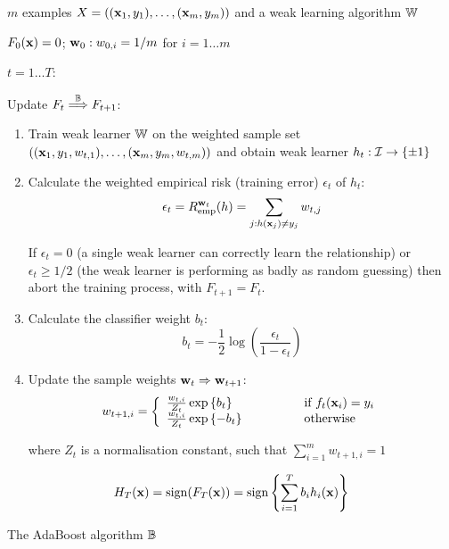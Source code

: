 \begin{linefigure}
\label{fig:boosting algorithm}
 $m$ examples $X = ((\mathbf{x}_1, y_1), \ldots, (\mathbf{x}_m,
y_m))$ and a weak learning algorithm $\mathbb{W}$
\par
{} $F_0(\mathbf{x}) = 0$; $\mathbf{w}_0 : w_{0,i} = 1/m$ for
$i=1 \ldots m$ 
\par
{} $t=1 \ldots T$:
\par
\noindent Update $F_t \stackrel{\mathbb{B}}{\Longrightarrow} F_{t+1}$: 
\par
\begin{enumerate}

\item	Train weak learner $\mathbb{W}$ on the weighted sample set 
	$((\mathbf{x}_1, y_1, w_{t,1}), \ldots, (\mathbf{x}_m, y_m, w_{t,m}))$
	and obtain weak learner $h_t : \mathcal{I} \rightarrow \{\pm 1\}$

\item	Calculate the weighted empirical risk (training error)
	$\epsilon_t$ of $h_t$: 
	\begin{equation}
	\epsilon_t = R_{\mathrm{emp}}^{\mathbf{w}_t}(h) = \sum_{j : h(\mathbf{x}_j) \neq
	y_j} w_{t,j}
	\end{equation}

	If $\epsilon_t = 0$ (a single weak learner can correctly learn
	the relationship) or $\epsilon_t \geq 1/2$ (the weak
	learner is performing as badly as random guessing) then abort
	the training process, with $F_{t+1} = F_{t}$.

\item	Calculate the classifier weight $b_t$:
	\begin{equation}
	b_t = - \frac{1}{2} \log \left( \frac{\epsilon_t}{1 -
	\epsilon_t} \right)
	\end{equation}

\item	Update the sample weights $\mathbf{w}_t \Rightarrow \mathbf{w}_{t+1}$:
	\begin{equation}
	w_{t+1, i} = \left\{
	\begin{array}{ll}
		\frac{w_{t, i}}{Z_t} \exp \left\{ b_t \right\}&	\qquad
		\qquad \mbox{if  $f_t(\mathbf{x}_i) = y_i$} \\
		\frac{w_{t, i}}{Z_t} \exp \left\{ -b_t \right\} & \qquad \qquad
		\mbox{otherwise} \\
	\end{array} \right.
	\label{eqn:sample weight update}
	\end{equation}

	where $Z_t$ is a normalisation constant, such that
	$\sum_{i=1}^{m} w_{t+1, i} = 1$
\end{enumerate}

\par
{} 
\begin{equation}
H_T(\mathbf{x}) = \mathrm{sign} (F_T(\mathbf{x})) = \mathrm{sign} \left\{ \sum_{i=1}^T b_i
h_i(\mathbf{x}) \right\} 
\end{equation}
\caption{The AdaBoost algorithm $\mathbb{B}$}
\end{linefigure}

